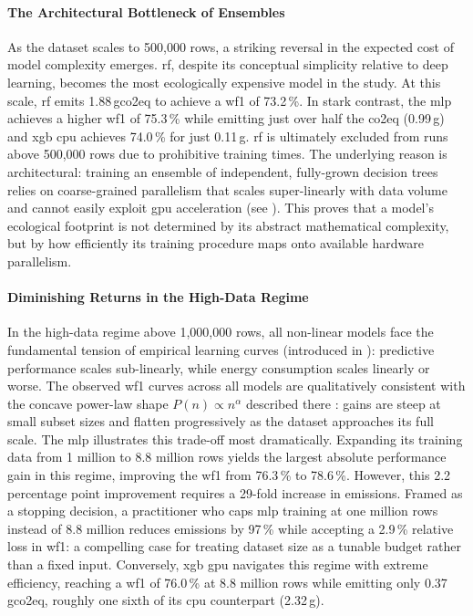\FloatBarrier
\paragraph{The Architectural Bottleneck of Ensembles}
As the dataset scales to 500{,}000 rows, a striking reversal in the expected cost of model complexity emerges. \gls{rf}, despite its conceptual simplicity relative to deep learning, becomes the most ecologically expensive model in the study. At this scale, \gls{rf} emits 1.88\,\gls{gco2eq} to achieve a \gls{wf1} of 73.2\,\%. In stark contrast, the \gls{mlp} achieves a higher \gls{wf1} of 75.3\,\% while emitting just over half the \gls{co2eq} (0.99\,g) and \gls{xgb} \gls{cpu} achieves 74.0\,\% for just 0.11\,g. \gls{rf} is ultimately excluded from runs above 500{,}000 rows due to prohibitive training times. The underlying reason is architectural: training an ensemble of independent, fully-grown decision trees relies on coarse-grained parallelism that scales super-linearly with data volume and cannot easily exploit \gls{gpu} acceleration (see ). This proves that a model's ecological footprint is not determined by its abstract mathematical complexity, but by how efficiently its training procedure maps onto available hardware parallelism.

\FloatBarrier
\paragraph{Diminishing Returns in the High-Data Regime}
In the high-data regime above 1{,}000{,}000 rows, all non-linear models face the fundamental tension of empirical learning curves (introduced in ): predictive performance scales sub-linearly, while energy consumption scales linearly or worse. The observed \gls{wf1} curves across all models are qualitatively consistent with the concave power-law shape $P(n) \propto n^\alpha$ described there \parencite{koshuteRecommendingTrainingSet2021}: gains are steep at small subset sizes and flatten progressively as the dataset approaches its full scale. The \gls{mlp} illustrates this trade-off most dramatically. Expanding its training data from 1 million to 8.8 million rows yields the largest absolute performance gain in this regime, improving the \gls{wf1} from 76.3\,\% to 78.6\,\%. However, this 2.2 percentage point improvement requires a 29-fold increase in emissions. Framed as a stopping decision, a practitioner who caps \gls{mlp} training at one million rows instead of 8.8 million reduces emissions by 97\,\% while accepting a 2.9\,\% relative loss in \gls{wf1}: a compelling case for treating dataset size as a tunable budget rather than a fixed input. Conversely, \gls{xgb} \gls{gpu} navigates this regime with extreme efficiency, reaching a \gls{wf1} of 76.0\,\% at 8.8 million rows while emitting only 0.37\,\gls{gco2eq}, roughly one sixth of its \gls{cpu} counterpart (2.32\,g).

